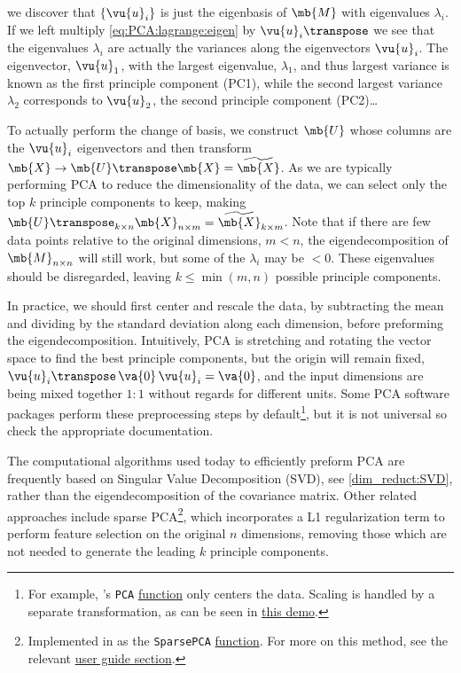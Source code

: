 \noindent we discover that $\left\{\vu{u}_{i}\right\}$
is just the eigenbasis of $\mb{M}$ with eigenvalues $\lambda_{i}$.
If we left multiply \cref{eq:PCA:lagrange:eigen} by $\vu{u}_{i}\transpose$
we see that the eigenvalues $\lambda_{i}$ are actually the variances along the eigenvectors $\vu{u}_{i}$.
The eigenvector, $\vu{u}_{1}$, with the largest eigenvalue, $\lambda_{1}$, and thus largest variance
is known as the first principle component (PC1),
while the second largest variance $\lambda_{2}$ corresponds to $\vu{u}_{2}$,
the second principle component (PC2)\ldots

To actually perform the change of basis,
we construct $\mb{U}$ whose columns are the $\vu{u}_{i}$ eigenvectors
and then transform $\mb{X} \to\mb{U}\transpose \mb{X} = \widetilde{\mb{X}}$.
As we are typically performing PCA to reduce the dimensionality of the data,
we can select only the top $k$ principle components to keep, making
$\mb{U}\transpose_{k \times n} \mb{X}_{n \times m} = \widetilde{\mb{X}}_{k \times m}$.
Note that if there are few data points relative to the original dimensions, $m < n$,
the eigendecomposition of $\mb{M}_{n \times n}$ will still work, but some of the $\lambda_{i}$ may be $< 0$.
These eigenvalues should be disregarded, leaving $k \leq \min\left(m,n\right)$ possible principle components.

In practice, we should first center and rescale the data,
by subtracting the mean and dividing by the standard deviation along each dimension,
before preforming the eigendecomposition.
Intuitively, PCA is stretching and rotating the vector space to find the best principle components,
but the origin will remain fixed, $\vu{u}_{i}\transpose\,\va{0}\,\vu{u}_{i} = \va{0}$,
and the input dimensions are being mixed together $1 \mathbin{:} 1$ without regards for different units.
Some PCA software packages perform these preprocessing steps by default\footnote{For example,
{\sklearn}'s \texttt{PCA}
\href{https://scikit-learn.org/stable/modules/generated/sklearn.decomposition.PCA.html}{function}
only centers the data.
Scaling is handled by a separate transformation, as can be seen in
\href{https://scikit-learn.org/stable/auto\_examples/preprocessing/plot\_scaling\_importance.html}{this demo}.},
but it is not universal so check the appropriate documentation.

The computational algorithms used today to efficiently preform PCA are
frequently based on Singular Value Decomposition (SVD), see \cref{dim_reduct:SVD},
rather than the eigendecomposition of the covariance matrix.
Other related approaches include sparse PCA\footnote{Implemented
in \sklearn as the \texttt{SparsePCA}
\href{https://scikit-learn.org/stable/modules/generated/sklearn.decomposition.SparsePCA.html}{function}.
For more on this method, see the relevant \sklearn
\href{https://scikit-learn.org/stable/modules/decomposition.html\#sparsepca}{user guide section}.},
which incorporates a L1 regularization term to perform feature selection on the original $n$ dimensions,
removing those which are not needed to generate the leading $k$ principle components.

